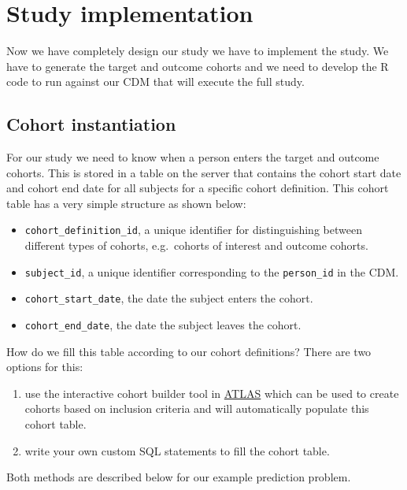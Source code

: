 \documentclass[]{article}
\providecommand{\tightlist}{%
  \setlength{\itemsep}{0pt}\setlength{\parskip}{0pt}}
\begin{document}
\section{Study implementation}\label{study-implementation}

Now we have completely design our study we have to implement the study.
We have to generate the target and outcome cohorts and we need to
develop the R code to run against our CDM that will execute the full
study.

\subsection{Cohort instantiation}\label{cohort-instantiation}

For our study we need to know when a person enters the target and
outcome cohorts. This is stored in a table on the server that contains
the cohort start date and cohort end date for all subjects for a
specific cohort definition. This cohort table has a very simple
structure as shown below:

\begin{itemize}
\tightlist
\item
  \texttt{cohort\_definition\_id}, a unique identifier for
  distinguishing between different types of cohorts, e.g.~cohorts of
  interest and outcome cohorts.
\item
  \texttt{subject\_id}, a unique identifier corresponding to the
  \texttt{person\_id} in the CDM.
\item
  \texttt{cohort\_start\_date}, the date the subject enters the cohort.
\item
  \texttt{cohort\_end\_date}, the date the subject leaves the cohort.
\end{itemize}

How do we fill this table according to our cohort definitions? There are
two options for this:

\begin{enumerate}
\def\labelenumi{\arabic{enumi})}
\item
  use the interactive cohort builder tool in
  \href{www.github.com/OHDSI/ATLAS}{ATLAS} which can be used to create
  cohorts based on inclusion criteria and will automatically populate
  this cohort table.
\item
  write your own custom SQL statements to fill the cohort table.
\end{enumerate}

Both methods are described below for our example prediction problem.
\end{document}
